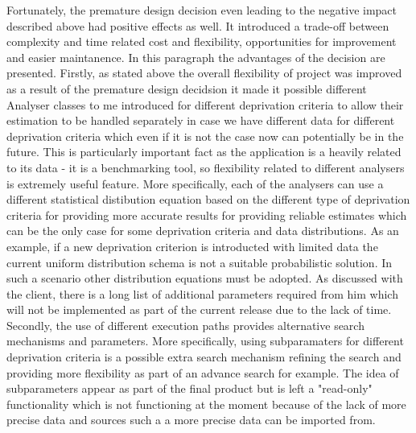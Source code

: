 \documentclass{l3proj}
\begin{document}
Fortunately, the premature design decision even leading to the negative impact described above had positive effects as well. It introduced a trade-off between complexity and time related cost and flexibility, opportunities for improvement and easier maintanence. In this paragraph the advantages of the decision are presented. Firstly, as stated above the overall flexibility of project was improved as a result of the premature design decidsion it made it possible different Analyser classes to me introduced for different deprivation criteria to allow their estimation to be handled separately in case we have different data for different deprivation criteria which even if it is not the case now can potentially be in the future. This is particularly important fact as the application is a heavily related to its data - it is a benchmarking tool, so flexibility related to different analysers is extremely useful feature. More specifically, each of the analysers can use a different statistical distibution equation based on the different type of deprivation criteria for providing more accurate results for providing reliable estimates which can be the only case for some deprivation criteria and data distributions. As an example, if a new deprivation criterion is introducted with limited data the current uniform distribution schema is not a suitable probabilistic solution. In such a scenario other distribution equations must be adopted. As discussed with the client, there is a long list of additional parameters required from him which will not be implemented as part of the current release due to the lack of time. Secondly, the use of different execution paths provides alternative search mechanisms and parameters. More specifically, using subparamaters for different deprivation criteria is a possible extra search mechanism refining the search and providing more flexibility as part of an advance search for example. The idea of subparameters appear as part of the final product but is left a "read-only" functionality which is not functioning at the moment because of the lack of more precise data and sources such a a more precise data can be imported from.
\end{document}
